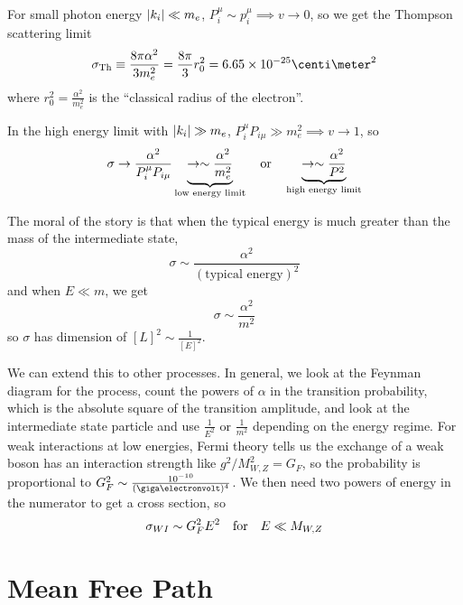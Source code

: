 \documentclass[a4paper,twoside,master.tex]{subfiles}
\begin{document}
For small photon energy $ \abs{k_i} \ll m_e $, $ P_i^{\mu} \sim p_i^{\mu} \implies v \to 0 $, so we get the Thompson scattering limit
\begin{equation}
    \sigma_{\text{Th}} \equiv \frac{8 \pi \alpha^2}{3 m_e^2} = \frac{8 \pi}{3} r_0^2 = 6.65 \times 10^{-25} \centi\meter^2
\end{equation}
where $ r_0^2 = \frac{\alpha^2}{m_e^2} $ is the ``classical radius of the electron''.

In the high energy limit with $ \abs{k_i} \gg m_e $, $ P_i^{\mu} P_{i \mu} \gg m_e^2 \implies v \to 1 $, so
\begin{equation}
    \sigma \to \frac{\alpha^2}{P_i^{\mu} P_{i \mu}} \underbrace{\to \sim\frac{\alpha^2}{m_e^2}}_{\text{low energy limit}} \qor \underbrace{\to \sim \frac{\alpha^2}{P^2}}_{\text{high energy limit}}
\end{equation}

The moral of the story is that when the typical energy is much greater than the mass of the intermediate state,
\begin{equation}
    \sigma \sim \frac{\alpha^2}{(\text{typical energy})^2}
\end{equation}
and when $ E \ll m $, we get
\begin{equation}
    \sigma \sim \frac{\alpha^2}{m^2}
\end{equation}
so $ \sigma $ has dimension of $ [L]^2 \sim \frac{1}{[E]^2} $. 


We can extend this to other processes. In general, we look at the Feynman diagram for the process, count the powers of $ \alpha $ in the transition probability, which is the absolute square of the transition amplitude, and look at the intermediate state particle and use $ \frac{1}{E^2} $ or $ \frac{1}{m^2} $ depending on the energy regime. For weak interactions at low energies, Fermi theory tells us the exchange of a weak boson has an interaction strength like $ g^2 / M_{W,Z}^2 = G_F $, so the probability is proportional to $ G_F^2 \sim \frac{10^{-10}}{(\giga\electronvolt)^4} $. We then need two powers of energy in the numerator to get a cross section, so
\begin{equation}
    \sigma_{WI} \sim G_F^2 E^2 \qfor E \ll M_{W,Z}
\end{equation}

\section{Mean Free Path}\label{sec:mean_free_path}
\end{document}

